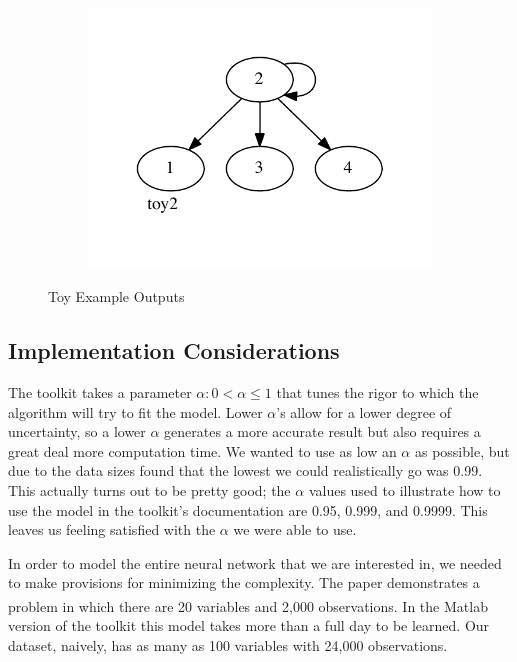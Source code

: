 \documentclass{article}
\begin{document}
\begin{figure}[h]
\begin{subfigure}{0.25\textwidth}
    \label{toy1}
  \end{subfigure}
  ~
  \begin{subfigure}{0.5\textwidth}
    \includegraphics[width=\textwidth]{toy2}
    \label{toy2}
  \end{subfigure}

  \caption{Toy Example Outputs}
  \label{toys}
\end{figure}

\subsection{Implementation Considerations}

The toolkit takes a parameter $\alpha : 0 < \alpha \le 1$ that tunes the rigor 
to which the algorithm will try to fit the model. Lower $\alpha$'s allow for 
a lower degree of uncertainty, so a lower $\alpha$ generates a more accurate 
result but also requires a great deal more computation time. We wanted to use 
as low an $\alpha$ as possible, but due to the data sizes found that the 
lowest we could realistically go was 0.99. This actually turns out to be 
pretty good; the $\alpha$ values used to illustrate how to use the model in 
the toolkit's documentation are 0.95, 0.999, and 0.9999. This leaves us 
feeling satisfied with the $\alpha$ we were able to use.\par

In order to model the entire neural network that we are interested in, we  
needed to make provisions for minimizing the complexity. The 
paper\cite{globalmit} demonstrates a problem in which there are 20 variables 
and 2,000 observations. In the Matlab\textsuperscript{\textregistered} version 
of the toolkit this model takes more than a full day to be learned. Our 
dataset, naively, has as many as 100 variables with 24,000 observations. \par
\end{document}
